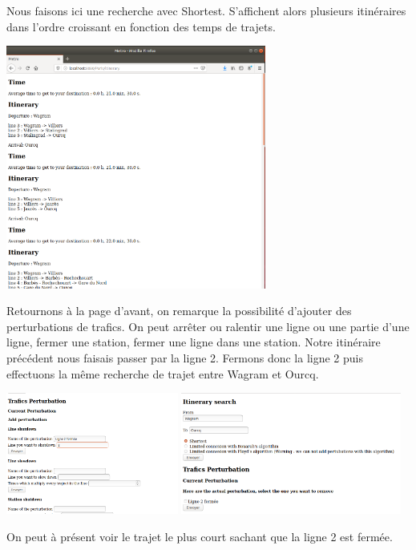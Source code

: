 \documentclass[12pt,french]{article}
\begin{document}
Nous faisons ici une recherche avec Shortest. S'affichent alors plusieurs itinéraires dans l'ordre croissant en fonction des temps de trajets.

\includegraphics[height=8cm]{images/itineraryWithoutPbs.png}

Retournons à la page d'avant, on remarque la possibilité d'ajouter des perturbations de trafics. On peut arrêter ou ralentir une ligne ou une partie d'une ligne, fermer une station, fermer une ligne dans une station. Notre itinéraire précédent nous faisais passer par la ligne 2. Fermons donc la ligne 2 puis effectuons la même recherche de trajet entre Wagram et Ourcq.

\includegraphics[height=4cm]{images/traficsPerturb.png}
\includegraphics[height=4cm]{images/researchWithPbs.png}

On peut à présent voir le trajet le plus court sachant que la ligne 2 est fermée.
\end{document}
